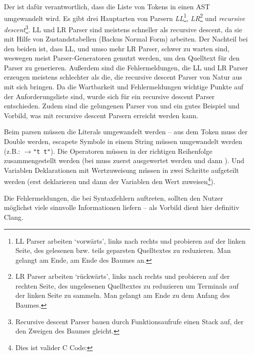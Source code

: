       Der  ist dafür verantwortlich, dass die Liste von Tokens in einen AST umgewandelt wird. Es gibt drei Hauptarten von Parsern \emph{LL}\footnote{
        LL Parser arbeiten `vorwärts', links nach rechts und probieren auf der linken Seite, des gelesenen bzw. teils geparsten Quelltextes zu reduzieren. Man gelangt am Ende, am Ende des Baumes an.
      }, \emph{LR}\footnote{
        LR Parser arbeiten `rückwärts', links nach rechts und probieren auf der rechten Seite, des ungelesenen Quelltextes zu reduzieren um Terminals auf der linken Seite zu sammeln. Man gelangt am Ende zu dem Anfang des Baumes.\autocite{cs143-stanford}
      } und \emph{recursive descent}\footnote{
        Recursive descent Parser bauen durch Funktionsaufrufe einen Stack auf, der den Zweigen des Baumes gleicht.
      }.
      LL und LR Parser sind meistens schneller als recursive descent, da sie mit Hilfe von Zustandstabellen (Backus Normal Form) arbeiten. Der Nachteil bei den beiden ist, dass LL, und umso mehr LR Parser, schwer zu warten sind, weswegen meist Parser-Generatoren genutzt werden, um den Quelltext für den Parser zu generieren. Außerdem sind die Fehlermeldungen, die LL und LR Parser erzeugen meistens schlechter als die, die recursive descent Parser von Natur aus mit sich bringen\autocite{scott2010gll}. Da die Wartbarkeit und Fehlermeldungen wichtige Punkte auf der Anforderungsliste sind, wurde sich für ein recursive descent Parser entschieden. Zudem sind die gelungenen Parser von  und  ein gutes Beispiel und Vorbild, was mit recursive descent Parsern erreicht werden kann.

      Beim parsen müssen die Literals umgewandelt werden -- aus dem Token  muss der Double  werden, escapete Symbole in einem String müssen umgewandelt werden (z.B.: $\rightarrow$\texttt{"t  t"}). Die Operatoren müssen in der richtigen Reihenfolge zusammengestellt werden (bei  muss  zuerst ausgewertet werden und dann ). Und Variablen Deklarationen mit Wertzuweisung müssen in zwei Schritte aufgeteilt werden (erst deklarieren und dann der Variablen den Wert zuweisen\footnote{
        Dies ist valider C Code: 
      }).

      Die Fehlermeldungen, die bei Syntaxfehlern auftreten, sollten den Nutzer möglichst viele sinnvolle Informationen liefern -- als Vorbild dient hier definitiv Clang.

